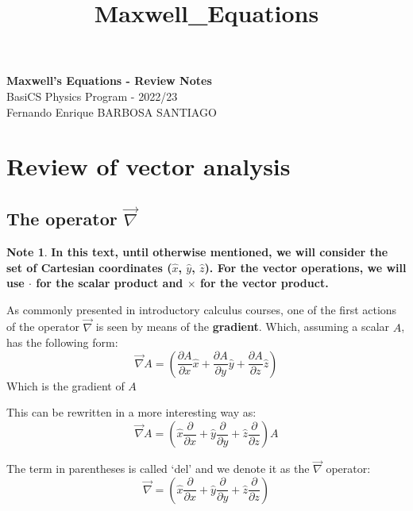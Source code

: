 \documentclass[11pt]{article}
\theoremstyle{definition}
\newtheorem{note}{Note}
\begin{document}
\setcounter{section}{0}
\title{Maxwell_Equations}

\thispagestyle{empty}

\begin{center}
{\LARGE \bf Maxwell's Equations - Review Notes}\\
{\large BasiCS Physics Program - 2022/23}\\
Fernando Enrique BARBOSA SANTIAGO
\end{center}
\section{Review of vector analysis}
\subsection{The operator $\vec{\nabla}$}
\begin{note}
\textbf{In this text, until otherwise mentioned, we will consider the set of Cartesian coordinates ($\hat{x}$, $\hat{y}$, $\hat{z}$). For the
vector operations, we will use $\cdot$ for the scalar product and $\times$ for the vector product.}
\end{note}

As commonly presented in introductory calculus courses, one of the first actions of the operator $\vec{\nabla}$ is seen by means of the \textbf{gradient}.
Which, assuming a scalar $A$, has the following form:
\begin{equation}
\vec{\nabla} A = \left(\frac{\partial A}{\partial x}\hat{x}+\frac{\partial A}{\partial y}\hat{y}+\frac{\partial A}{\partial z}\hat{z}\right)
\end{equation}
Which is the gradient of $A$ 

This can be rewritten in a more interesting way as:
\begin{equation}
\vec{\nabla} A = \left(\hat{x}\frac{\partial}{\partial x}+\hat{y}\frac{\partial}{\partial y}+\hat{z}\frac{\partial}{\partial z}\right)A
\end{equation}

The term in parentheses is called `del' and we denote it as the $\vec{\nabla}$ operator:
\begin{equation}
\vec{\nabla} = \left(\hat{x}\frac{\partial}{\partial x}+\hat{y}\frac{\partial}{\partial y}+\hat{z}\frac{\partial}{\partial z}\right)
\end{equation}
\end{document}

